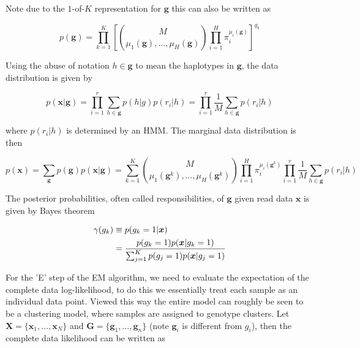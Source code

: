 \documentclass{article}
\begin{document}
Note due to the $1$-of-$K$ representation for $\boldsymbol{g}$ this can also be written as

\begin{equation} 
    p(\boldsymbol{g}) = \prod_{k = 1}^K \left[\binom{M}{\mu_1(\boldsymbol{g}),\dots,\mu_H(\boldsymbol{g})} \prod_{i = 1}^H \pi_i^{\mu_i(\boldsymbol{g})}\right]^{g_k}
\end{equation}

Using the abuse of notation $h \in \boldsymbol{g}$ to mean the haplotypes in $\boldsymbol{g}$, the data distribution is given by

\begin{equation} 
    p(\boldsymbol{x} | \boldsymbol{g}) = \prod_{i = 1}^{r} \sum_{h \in \boldsymbol{g}} p(h | g) p(r_i | h)  = \prod_{i = 1}^{r} \frac{1}{M} \sum_{h \in \boldsymbol{g}} p(r_i | h)
\end{equation}

where $p(r_i | h)$ is determined by an HMM. The marginal data distribution is then

\begin{equation} 
    p(\boldsymbol{x}) = \sum_{\boldsymbol{g}} p(\boldsymbol{g}) p(\boldsymbol{x} | \boldsymbol{g}) = \sum_{k = 1}^{K}  \binom{M}{\mu_1(\boldsymbol{g}^k),\dots,\mu_H(\boldsymbol{g}^k)} \prod_{i = 1}^H \pi_i^{\mu_i(\boldsymbol{g}^k)} \prod_{i = 1}^{r} \frac{1}{M} \sum_{h \in \boldsymbol{g}} p(r_i | h)
\end{equation}

The posterior probabilities, often called responsibilities, of $\boldsymbol{g}$ given read data $\boldsymbol{x}$ is given by Bayes theorem

\begin{align} 
    \gamma(g_k) &\equiv p(g_k = 1 | \boldsymbol{x}) \notag\\
    &= \frac{p(g_k = 1) p(\boldsymbol{x} | g_k = 1)}{\sum_{j = 1}^{K} p(g_j = 1) p(\boldsymbol{x} | g_j = 1)}
\end{align}

For the 'E' step of the EM algorithm, we need to evaluate the expectation of the complete data log-likelihood, to do this we essentially treat each sample as an individual data point. Viewed this way the entire model can roughly be seen to be a clustering model, where samples are assigned to genotype clusters. Let $\boldsymbol{X} = \{\boldsymbol{x}_1, \dots, \boldsymbol{x}_N\}$ and $\boldsymbol{G} = \{\boldsymbol{g}_1, \dots, \boldsymbol{g}_n\}$ (note $\boldsymbol{g}_i$ is different from $g_i$), then the complete data likelihood can be written as
\end{document}
